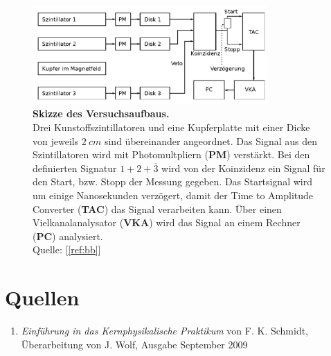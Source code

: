 \documentclass[a4paper,ngerman]{scrartcl}
\begin{document}
\begin{figure}[tb!]
  \centering
  \includegraphics[width=0.8\textwidth]{abbildungen/aufbau_skizze.png}
  \caption{\textbf{Skizze des Versuchsaufbaus.} 
  \\ 
  Drei Kunstoffszintillatoren und eine Kupferplatte mit einer Dicke von jeweils $\SI{2}{cm}$ sind übereinander angeordnet. 	Das Signal aus den Szintillatoren wird mit Photomultpliern (\textbf{PM}) verstärkt. Bei den definierten Signatur $1 + 2 + \overline{3}$ wird von der Koinzidenz ein Signal für den Start, bzw. Stopp der Messung gegeben. Das Startsignal wird um einige Nanosekunden verzögert, damit der Time to Amplitude Converter (\textbf{TAC}) das Signal verarbeiten kann. Über einen Vielkanalanalysator (\textbf{VKA}) wird das Signal an einem Rechner (\textbf{PC}) analysiert.
  \\Quelle: [\ref{ref:bb}]}
  \label{fig:blmaufbau}
\end{figure}




\clearpage
\section{Quellen}
\begin{enumerate}
\item \emph{Einführung in das Kernphysikalische Praktikum} von F. K. Schmidt, 
  Überarbeitung von J. Wolf, Ausgabe September 2009 \label{ref:bb}
\end{enumerate}
\end{document}

